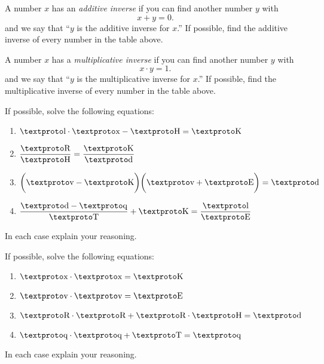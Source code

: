 \documentclass[nooutcomes]{ximera}
\begin{document}
\begin{problem}
A number $x$ has an \textit{additive inverse} if you can find another number $y$ with 
\[
x + y = 0.
\]
and we say that ``$y$ is the additive inverse for $x$.'' If possible,
find the additive inverse of every number in the table above.
\end{problem}

\begin{problem}
A number $x$ has a \textit{multiplicative inverse} if you can find
another number $y$ with
\[
x\cdot y = 1.
\]
and we say that ``$y$ is the multiplicative inverse for $x$.'' If
possible, find the multiplicative inverse of every number in the
table above.
\end{problem}



\begin{problem} If possible, solve the following equations:
\begin{enumerate}
\item $\lh \cdot \lx - \lb = \ld$
\item $\dfrac{\ly}{\lb} = \dfrac{\ld}{\loo}$
\item $\bigg(\lz - \ld\bigg)\bigg(\lz + \lf\bigg)=\loo$
\item $\dfrac{\loo - \lw}{\lc} + \ld = \dfrac{\lh}{\lf}$
\end{enumerate}
In each case explain your reasoning.
\end{problem}

\begin{problem} If possible, solve the following equations:
\begin{enumerate}
\item $\lx \cdot \lx = \ld$
\item $\lz\cdot \lz = \lf$
\item $\ly\cdot \ly + \ly \cdot \lb = \loo$
\item $\lw \cdot \lw+ \lc = \lw$
\end{enumerate}
In each case explain your reasoning.
\end{problem}
\end{document}
